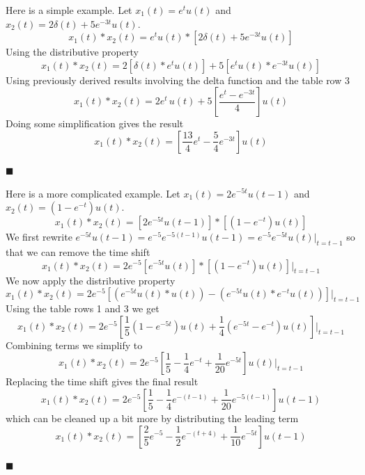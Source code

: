 \begin{example} Here is a simple example. Let $x_1(t) = e^tu(t)$ and $x_2(t) = 2\delta(t) + 5e^{-3t}u(t)$.
  \[
  x_1(t) * x_2(t) =  e^tu(t) * \left[2\delta(t) + 5e^{-3t}u(t)\right] 
  \]
  Using the distributive property
  \[
  x_1(t) * x_2(t) =  2\left[\delta(t) * e^tu(t)\right]  + 5\left[e^tu(t) * e^{-3t}u(t)\right]
  \]
  Using previously derived results involving the delta function and the table row 3
  \[
  x_1(t) * x_2(t) = 2 e^t\, u(t) + 5\left[ \frac{e^t-e^{-3t}}{4}\right]u(t)
  \]
  Doing some simplification gives the result
  \[
  x_1(t) * x_2(t) = \left[ \frac{13}{4}e^t-\frac{5}{4}e^{-3t}\right]u(t)
  \]
  
$\blacksquare$
\end{example}

\begin{example} Here is a more complicated example. Let $x_1(t) = 2e^{-5t}u(t-1)$ and $x_2(t) = \left(1-e^{-t}\right)u(t)$.
  \[
  x_1(t) * x_2(t) = \left[2e^{-5t}u(t-1)\right] * \left[\left(1-e^{-t}\right)u(t)\right]
  \]
  We first rewrite $e^{-5t}u(t-1)=e^{-5}e^{-5(t-1)}u(t-1) = e^{-5}e^{-5t}u(t)\Big|_{t=t-1}$ so that we can remove the time shift
  \[
  x_1(t) * x_2(t) = 2e^{-5}\left[e^{-5t}u(t)\right] * \left[\left(1-e^{-t}\right)u(t)\right]\Big|_{t=t-1}
  \]
  We now apply the distributive property
  \[
x_1(t) * x_2(t) = 2e^{-5}\left[\left(e^{-5t}u(t) * u(t)\right) - \left(e^{-5t}u(t)* e^{-t}u(t)\right)\right]\Big|_{t=t-1}
  \]
  Using the table rows 1 and 3 we get
  \[
  x_1(t) * x_2(t) = 2e^{-5}\left[\frac{1}{5}\left(1-e^{-5t}\right)u(t) + \frac{1}{4}\left(e^{-5t} - e^{-t}\right)u(t)\right]\Big|_{t=t-1}
  \]
  Combining terms we simplify to
  \[
x_1(t) * x_2(t) = 2e^{-5}\left[\frac{1}{5} - \frac{1}{4}e^{-t} + \frac{1}{20}e^{-5t} \right]u(t)\Big|_{t=t-1}
\]
Replacing the time shift gives the final result
\[
x_1(t) * x_2(t) = 2e^{-5}\left[\frac{1}{5} - \frac{1}{4}e^{-(t-1)} + \frac{1}{20}e^{-5(t-1)} \right]u(t-1)
\]
which can be cleaned up a bit more by distributing the leading term
\[
x_1(t) * x_2(t) =\left[\frac{2}{5}e^{-5} -\frac{1}{2}e^{-(t+4)} +\frac{1}{10}e^{-5t}\right]u(t-1)
\]
  
$\blacksquare$
\end{example}

